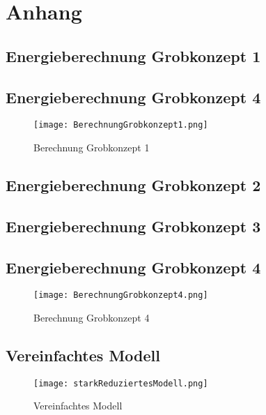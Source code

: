 \section{Anhang} \label{sec:anhang}

\subsection{Energieberechnung Grobkonzept 1} \label{subsec:grobkonzept1}
\subsection{Energieberechnung Grobkonzept 4} \label{subsec:grobkonzept4}
\begin{figure} [H]
	\centering
	\texttt{[image: BerechnungGrobkonzept1.png]}
	\caption{Berechnung Grobkonzept 1}
	\label{fig:BerechnungGrobkonzept1}
\end{figure}

\subsection{Energieberechnung Grobkonzept 2} \label{subsec:grobkonzept2}

\subsection{Energieberechnung Grobkonzept 3} \label{subsec:grobkonzept3}

\subsection{Energieberechnung Grobkonzept 4} \label{subsec:grobkonzept4}
\begin{figure} [H]
	\centering
	\texttt{[image: BerechnungGrobkonzept4.png]}
	\caption{Berechnung Grobkonzept 4}
	\label{fig:BerechnungGrobkonzept4}
\end{figure}

\subsection{Vereinfachtes Modell} \label{subsec:vereinfachtesModel}
\begin{figure} [H]
	\centering
	\texttt{[image: starkReduziertesModell.png]}
	\caption{Vereinfachtes Modell}
	\label{fig:VereinfachtesModel}
\end{figure}